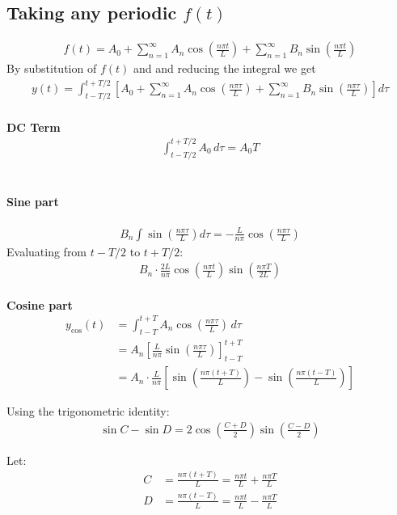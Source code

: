 \documentclass{article}
\begin{document}
\subsection{Taking any periodic $f(t)$}
\begin{align*}
f(t) = A_0 + \sum_{n=1}^\infty A_n \cos\left(\frac{n\pi t}{L}\right) + \sum_{n=1}^\infty B_n \sin\left(\frac{n\pi t}{L}\right)
\end{align*}
By substitution of $f(t)$ and and reducing the integral we get
\begin{align*}
y(t) = \int_{t - T/2}^{t + T/2} \left[ A_0 + \sum_{n=1}^\infty A_n \cos\left(\frac{n\pi \tau}{L}\right) + \sum_{n=1}^\infty B_n \sin\left(\frac{n\pi \tau}{L}\right) \right] d\tau
\end{align*}
\\
\textbf{DC Term}
\begin{align*}
\int_{t - T/2}^{t + T/2} A_0 \, d\tau = A_0 T
\end{align*}
\\
\paragraph{Sine part}
\begin{align*}
B_n \int \sin\left(\frac{n\pi \tau}{L}\right) d\tau = -\frac{L}{n\pi} \cos\left(\frac{n\pi \tau}{L}\right)
\end{align*}
Evaluating from $t - T/2$ to $t + T/2$:
\begin{align*}
B_n \cdot \frac{2L}{n\pi} \cos\left(\frac{n\pi t}{L}\right) \sin\left(\frac{n\pi T}{2L}\right)
\end{align*}
\\
\textbf{Cosine part}
\begin{align*}
y_{\text{cos}}(t) &= \int_{t - T}^{t + T} A_n \cos\left(\frac{n\pi \tau}{L}\right) \, d\tau \\
&= A_n \left[ \frac{L}{n\pi} \sin\left(\frac{n\pi \tau}{L}\right) \right]_{t - T}^{t + T} \\
&= A_n \cdot \frac{L}{n\pi} \left[ \sin\left(\frac{n\pi (t + T)}{L}\right) - \sin\left(\frac{n\pi (t - T)}{L}\right) \right]
\end{align*}

Using the trigonometric identity:
\begin{align*}
\sin C - \sin D = 2 \cos\left(\frac{C + D}{2}\right) \sin\left(\frac{C - D}{2}\right)
\end{align*}

Let:
\begin{align*}
C &= \frac{n\pi (t + T)}{L} = \frac{n\pi t}{L} + \frac{n\pi T}{L} \\
D &= \frac{n\pi (t - T)}{L} = \frac{n\pi t}{L} - \frac{n\pi T}{L}
\end{align*}
\end{document}
